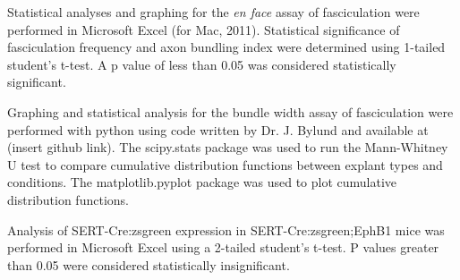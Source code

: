 Statistical analyses and graphing for the \emph{en face} assay of fasciculation were performed in Microsoft Excel (for Mac, 2011).
Statistical significance of fasciculation frequency and axon bundling index were determined using 1-tailed student's t-test.
A p value of less than 0.05 was considered statistically significant.

Graphing and statistical analysis for the bundle width assay of fasciculation were performed with python using code written by Dr. J. Bylund and available at (insert github link).
The scipy.stats package was used to run the Mann-Whitney U test to compare cumulative distribution functions between explant types and conditions.
The matplotlib.pyplot package was used to plot cumulative distribution functions.

Analysis of SERT-Cre:zsgreen expression in SERT-Cre:zsgreen;EphB1 mice was performed in Microsoft Excel using a 2-tailed student's t-test.
P values greater than 0.05 were considered statistically insignificant.